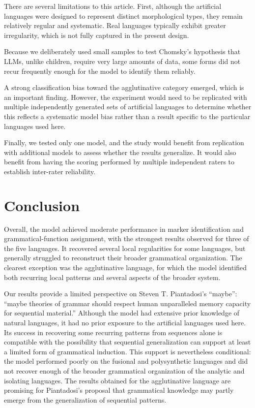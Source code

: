 \documentclass[11pt]{article}
\begin{document}
There are several limitations to this article. First, although the artificial languages were designed to represent distinct morphological types, they remain relatively regular and systematic. Real languages typically exhibit greater irregularity, which is not fully captured in the present design.

Because we deliberately used small samples to test Chomsky's hypothesis that LLMs, unlike children, require very large amounts of data, some forms did not recur frequently enough for the model to identify them reliably.~

A strong classification bias toward the agglutinative category emerged, which is an important finding. However, the experiment would need to be replicated with multiple independently generated sets of artificial languages to determine whether this reflects a systematic model bias rather than a result specific to the particular languages used here.~

Finally, we tested only one model, and the study would benefit from replication with additional models to assess whether the results generalize. It would also benefit from having the scoring performed by multiple independent raters to establish inter-rater reliability.~

\section{Conclusion}

Overall, the model achieved moderate performance in marker identification and grammatical-function assignment, with the strongest results observed for three of the five languages. It recovered several local regularities for some languages, but generally struggled to reconstruct their broader grammatical organization. The clearest exception was the agglutinative language, for which the model identified both recurring local patterns and several aspects of the broader system.

Our results provide a limited perspective on Steven T. Piantadosi's ``maybe'': ``maybe theories of grammar should respect human unparalleled memory capacity for sequential material.'' Although the model had extensive prior knowledge of natural languages, it had no prior exposure to the artificial languages used here. Its success in recovering some recurring patterns from sequences alone is compatible with the possibility that sequential generalization can support at least a limited form of grammatical induction. This support is nevertheless conditional: the model performed poorly on the fusional and polysynthetic languages and did not recover enough of the broader grammatical organization of the analytic and isolating languages. The results obtained for the agglutinative language are promising for Piantadosi's proposal that grammatical knowledge may partly emerge from the generalization of sequential patterns.
\end{document}
